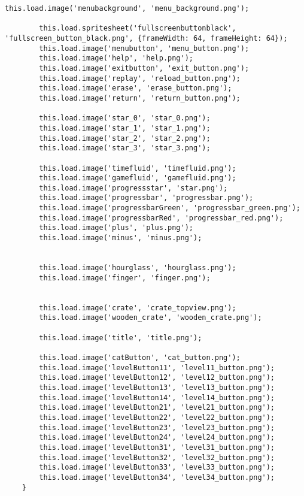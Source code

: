 \begin{lstlisting}[style=TypeScript, caption={preloadAsset.ts}]
        this.load.image('menubackground', 'menu_background.png');

        this.load.spritesheet('fullscreenbuttonblack', 'fullscreen_button_black.png', {frameWidth: 64, frameHeight: 64});
        this.load.image('menubutton', 'menu_button.png');
        this.load.image('help', 'help.png');
        this.load.image('exitbutton', 'exit_button.png');
        this.load.image('replay', 'reload_button.png');
        this.load.image('erase', 'erase_button.png');
        this.load.image('return', 'return_button.png');

        this.load.image('star_0', 'star_0.png');
        this.load.image('star_1', 'star_1.png');
        this.load.image('star_2', 'star_2.png');
        this.load.image('star_3', 'star_3.png');

        this.load.image('timefluid', 'timefluid.png');
        this.load.image('gamefluid', 'gamefluid.png');
        this.load.image('progressstar', 'star.png');
        this.load.image('progressbar', 'progressbar.png');
        this.load.image('progressbarGreen', 'progressbar_green.png');
        this.load.image('progressbarRed', 'progressbar_red.png');
        this.load.image('plus', 'plus.png');
        this.load.image('minus', 'minus.png');


        this.load.image('hourglass', 'hourglass.png');
        this.load.image('finger', 'finger.png');


        this.load.image('crate', 'crate_topview.png');
        this.load.image('wooden_crate', 'wooden_crate.png');

        this.load.image('title', 'title.png');

        this.load.image('catButton', 'cat_button.png');
        this.load.image('levelButton11', 'level11_button.png');
        this.load.image('levelButton12', 'level12_button.png');
        this.load.image('levelButton13', 'level13_button.png');
        this.load.image('levelButton14', 'level14_button.png');
        this.load.image('levelButton21', 'level21_button.png');
        this.load.image('levelButton22', 'level22_button.png');
        this.load.image('levelButton23', 'level23_button.png');
        this.load.image('levelButton24', 'level24_button.png');
        this.load.image('levelButton31', 'level31_button.png');
        this.load.image('levelButton32', 'level32_button.png');
        this.load.image('levelButton33', 'level33_button.png');
        this.load.image('levelButton34', 'level34_button.png');
    }


\end{lstlisting}
